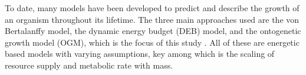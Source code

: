 \documentclass[a4paper, 11pt, hidelinks]{article} %
\begin{document}
	To date, many models have been developed to predict and describe the growth of an organism throughout its lifetime.  The three main approaches used are the von Bertalanffy model, the dynamic energy budget (DEB) model, and the ontogenetic growth model (OGM), which is the focus of this study \parencite{Putter1918, vonBertalanffy1938, Kooijman1986, West2001}.  All of these are energetic based models with varying assumptions, key among which is the scaling of resource supply and metabolic rate with mass. %
	
\end{document}
